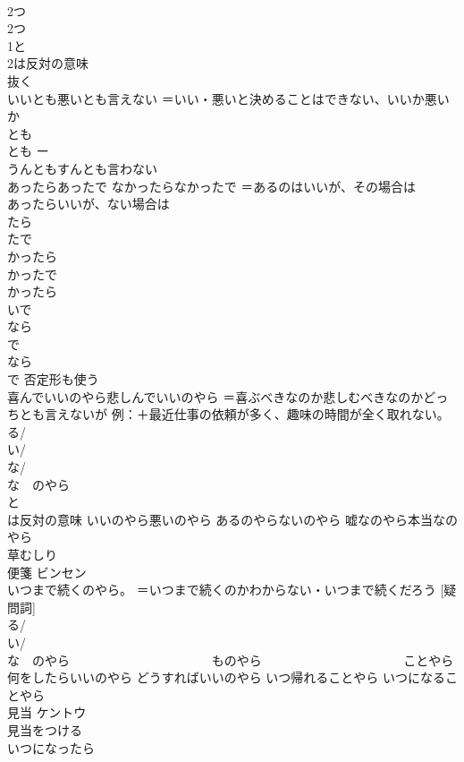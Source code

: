 \documentclass[8pt]{extreport}
\begin{document}
\begin{CJK}{UTF8}{min}
\\	2つ
\\	2つ 
\\	1と
\\	2は反対の意味
\\	抜く	
\\	いいとも悪いとも言えない	＝いい・悪いと決めることはできない、いいか悪いか 
\\	とも 
\\	とも ー
\\	うんともすんとも言わない 
\\	あったらあったで なかったらなかったで	＝あるのはいいが、その場合は 
\\	あったらいいが、ない場合は 
\\	たら
\\	たで 
\\	かったら
\\	かったで 
\\	かったら
\\	いで 
\\	なら
\\	で 
\\	なら
\\	で 否定形も使う
\\	喜んでいいのやら悲しんでいいのやら	＝喜ぶべきなのか悲しむべきなのかどっちとも言えないが 例：＋最近仕事の依頼が多く、趣味の時間が全く取れない。 
\\	る/
\\	い/
\\	な/
\\	な　のやら 
\\	と
\\	は反対の意味 いいのやら悪いのやら あるのやらないのやら 嘘なのやら本当なのやら
\\	草むしり	
\\	便箋	ビンセン 
\\	いつまで続くのやら。	＝いつまで続くのかわからない・いつまで続くだろう [疑問詞]　
\\	る/
\\	い/
\\	な　のやら 　　　　　　　　　　　ものやら 　　　　　　　　　　　ことやら 何をしたらいいのやら どうすればいいのやら いつ帰れることやら いつになることやら
\\	見当	ケントウ 
\\	見当をつける
\\	いつになったら	
\end{CJK}
\end{document}
